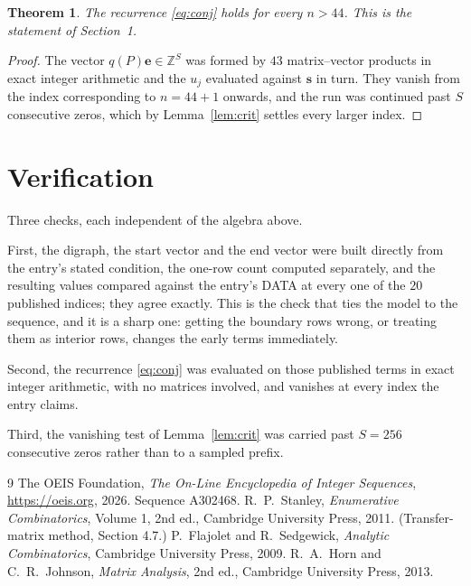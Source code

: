 \documentclass[11pt,a4paper]{article}
\theoremstyle{plain}
\newtheorem{theorem}{Theorem}
\theoremstyle{definition}
\begin{document}
\begin{theorem}
The recurrence \eqref{eq:conj} holds for every $n>44$. This is the statement of
Section~1.
\end{theorem}

\begin{proof}
The vector $q(P)\mathbf{e}\in\mathbb{Z}^{S}$ was formed by $43$ matrix--vector
products in exact integer arithmetic and the $u_j$ evaluated against $\mathbf{s}$ in turn.
They vanish from the index corresponding to $n=44+1$ onwards, and the run was continued
past $S$ consecutive zeros, which by Lemma~\ref{lem:crit} settles every larger index.
\end{proof}

\section{Verification}

Three checks, each independent of the algebra above.

First, the digraph, the start vector and the end vector were built directly from the
entry's stated condition, the one-row count computed separately, and the resulting values
compared against the entry's DATA at every one of the $20$ published indices; they
agree exactly. This is the check that ties the model to the sequence, and it is a sharp one:
getting the boundary rows wrong, or treating them as interior rows, changes the early terms
immediately.

Second, the recurrence \eqref{eq:conj} was evaluated on those published terms in exact
integer arithmetic, with no matrices involved, and vanishes at every index the entry claims.

Third, the vanishing test of Lemma~\ref{lem:crit} was carried past $S=256$ consecutive
zeros rather than to a sampled prefix.

\begin{thebibliography}{9}
 The OEIS Foundation, \emph{The On-Line Encyclopedia of Integer
Sequences}, \url{https://oeis.org}, 2026. Sequence A302468.
 R.~P.~Stanley, \emph{Enumerative Combinatorics}, Volume 1, 2nd ed.,
Cambridge University Press, 2011. (Transfer-matrix method, Section 4.7.)
 P.~Flajolet and R.~Sedgewick, \emph{Analytic Combinatorics}, Cambridge
University Press, 2009.
 R.~A.~Horn and C.~R.~Johnson, \emph{Matrix Analysis}, 2nd ed., Cambridge
University Press, 2013.
\end{thebibliography}
\end{document}
